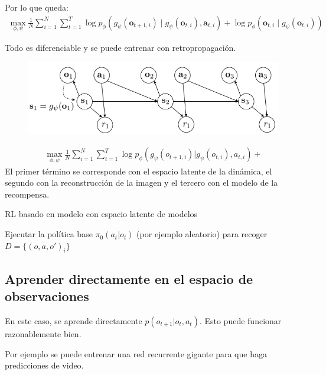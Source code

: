Por lo que queda:
\begin{align}
\max _{\phi, \psi} \frac{1}{N} \sum_{i=1}^{N} \sum_{t=1}^{T} \log p_{\phi}\left(g_{\psi}\left(\mathbf{o}_{t+1, i}\right) \mid g_{\psi}\left(\mathbf{o}_{t, i}\right), \mathbf{a}_{t, i}\right)+\log p_{\phi}\left(\mathbf{o}_{t, i} \mid g_{\psi}\left(\mathbf{o}_{t, i}\right)\right)
\end{align}

Todo es diferenciable y se puede entrenar con retropropagación.

\begin{figure}[htpb]
	\centering
	\includegraphics[width=0.5\linewidth]{figures/2020-06-27-201418_672x194_scrot.png}
\end{figure}

\begin{align}
\operatorname { max } _ { \phi , \psi } \frac { 1 } { N } \sum _ { i = 1 } ^ { N } \sum _ { t = 1 } ^ { T } \operatorname { log } p _ { \phi } ( g _ { \psi } ( o _ { t + 1 , i } ) | g _ { \psi } ( o _ { t , i } ) , a _ { t , i } ) +
\end{align}
El primer término se corresponde con el espacio latente de la dinámica, el segundo con la
reconstrucción de la imagen y el tercero con el modelo de la recompensa.

\begin{algorithm}
    \caption{RL basado en modelo con espacio latente de modelos}
    Ejecutar la política base $\pi_0(a_t|o_t)$ (por ejemplo aleatorio) para recoger
    $D=\{(o,a,o')_i\}$\\
\end{algorithm}

\subsection{Aprender directamente en el espacio de observaciones}%
\label{sub:aprender_directamente_en_el_espacio_de_observaciones}

En este caso, se aprende directamente $p(o_{t+1}|o_t,a_t)$. Esto puede funcionar
razonablemente bien.

Por ejemplo se puede entrenar una red recurrente gigante para que haga predicciones de
video.
